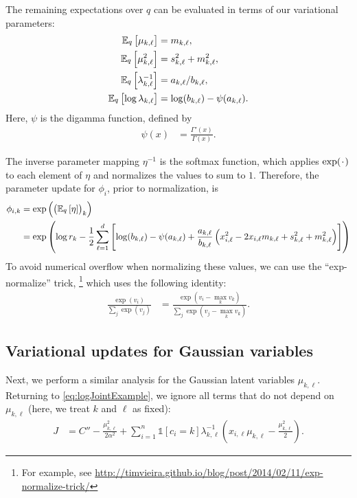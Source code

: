 \documentclass[11pt]{article}
\newcommand*{\placeholder}{\makebox[1ex]{$\cdot$}}
\begin{document}
The remaining expectations over $q$ can be evaluated in terms of our variational parameters:
\begin{align}
\mathbb{E}_{\substack{q}}\left[ \mu_{k,\ell} \right]
&= m_{k,\ell}, \\
\mathbb{E}_{\substack{q}}\left[ \mu_{k,\ell}^2 \right]
&= s_{k,\ell}^2 + m_{k,\ell}^2, \\
\mathbb{E}_{\substack{q}}\left[ \lambda_{k,\ell}^{-1} \right]
&= a_{k,\ell} / b_{k,\ell}, \\
\mathbb{E}_{\substack{q}}\left[ \log \lambda_{k,\ell} \right]
&= \log(b_{k,\ell}) - \psi(a_{k,\ell}).
\end{align}
Here, $\psi$ is the digamma function, defined by
\begin{align}
\psi(x) &= \frac{\Gamma'(x)}{\Gamma(x)}.
\end{align}

The inverse parameter mapping $\eta^{-1}$ is the softmax function, which applies $\exp(\placeholder)$ to each element of $\eta$ and normalizes the values to sum to $1$.
Therefore, the parameter update for $\phi_i$, prior to normalization, is
\begin{align}
\phi_{i,k}
&= \exp\left( \left( \mathbb{E}_{\substack{q}}\left[ \eta \right] \right)_k \right) \\
\label{eq:exVarUpdatePhi}
&=
\exp \left(
\log r_k - \frac{1}{2} \sum_{\ell=1}^d
    \left[
        \log(b_{k,\ell}) - \psi(a_{k,\ell}) + \frac{a_{k,\ell}}{b_{k,\ell}}
        \left(
            x_{i,\ell}^2 - 2 x_{i,\ell} m_{k,\ell} + s_{k,\ell}^2 + m_{k,\ell}^2
        \right)
    \right]
\right)
\end{align}
To avoid numerical overflow when normalizing these values, we can use the ``exp-normalize'' trick,%
\footnote{For example, see \url{http://timvieira.github.io/blog/post/2014/02/11/exp-normalize-trick/}}
which uses the following identity:
\begin{align}
\frac{\exp(v_i)}{\sum_j \exp(v_j)}
&= \frac{\exp(v_i - \max_k v_k)}{\sum_j \exp(v_j - \max_k v_k)}.
\end{align}

\subsection{Variational updates for Gaussian variables}

Next, we perform a similar analysis for the Gaussian latent variables $\mu_{k,\ell}$.
Returning to \eqref{eq:logJointExample}, we ignore all terms that do not depend on $\mu_{k,\ell}$ (here, we treat $k$ and $\ell$ as fixed):
\begin{align}
J
&=
    C'' - \frac{\mu_{k, \ell}^2}{2\alpha^2}
    + \sum_{i=1}^n \mathds{1}[c_i = k] \lambda_{k,\ell}^{-1} \left( x_{i,\ell} \mu_{k,\ell} - \frac{\mu_{k,\ell}^2}{2} \right)
    .
\end{align}
\end{document}
